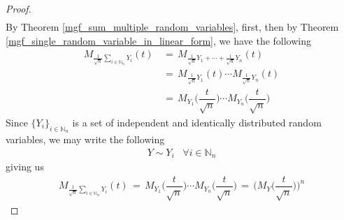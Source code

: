 \begin{theorem}
\begin{proof}
\begin{align*}
        \end{align*}
        By Theorem \ref{mgf_sum_multiple_random_variables}, first, then by Theorem \ref{mgf_single_random_variable_in_linear_form}, we have the following
        \begin{align*}
            M_{\frac{1}{\sqrt{n}}\sum_{i \in \mathbb{N}_{n}}Y_{i}} (t) \hspace{2pt} &= \hspace{2pt} M_{\frac{1}{\sqrt{n}}Y_{1} + \cdots + \frac{1}{\sqrt{n}}Y_{n}} (t) \\[1ex]
            &= \hspace{2pt} M_{\frac{1}{\sqrt{n}}Y_{1}} (t) \cdots M_{\frac{1}{\sqrt{n}}Y_{n}} (t) \\[1ex]
            &= \hspace{2pt} M_{Y_{1}} \Big(\dfrac{t}{\sqrt{n}}\Big) \cdots M_{Y_{n}} \Big(\dfrac{t}{\sqrt{n}}\Big)
        \end{align*}
        Since $\{Y_{i}\}_{i \in \mathbb{N}_{n}}$ is a set of independent and identically distributed random variables, we may write the following
        \begin{align*}
            Y \sim Y_{i} \hspace{10pt} \forall i \in \mathbb{N}_{n} 
        \end{align*}
        giving us
        \begin{align*}
            M_{\frac{1}{\sqrt{n}}\sum_{i \in \mathbb{N}_{n}}Y_{i}} (t) \hspace{2pt} = \hspace{2pt} M_{Y_{1}} \Big(\dfrac{t}{\sqrt{n}}\Big) \cdots M_{Y_{n}} \Big(\dfrac{t}{\sqrt{n}}\Big) \hspace{2pt} = \hspace{2pt} \Big(M_{Y} \Big(\dfrac{t}{\sqrt{n}}\Big) \Big)^{n}
        \end{align*}
    \end{proof}
\end{theorem}